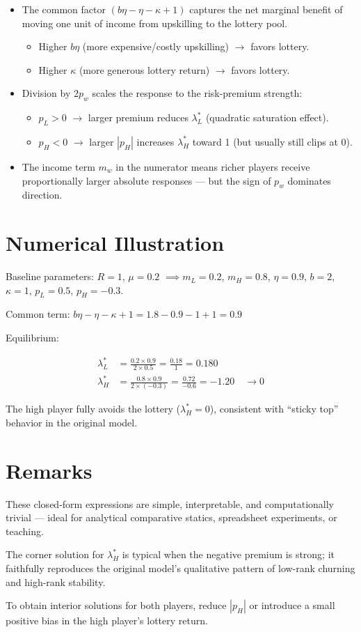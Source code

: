 \documentclass[11pt]{article}
\begin{document}
\begin{itemize}
    \item The common factor $(b \eta - \eta - \kappa + 1)$ captures the net marginal benefit of moving one unit of income from upskilling to the lottery pool.
          \begin{itemize}
              \item Higher $b \eta$ (more expensive/costly upskilling) $\to$ favors lottery.
              \item Higher $\kappa$ (more generous lottery return) $\to$ favors lottery.
          \end{itemize}
    \item Division by $2 p_w$ scales the response to the risk-premium strength:
          \begin{itemize}
              \item $p_L > 0$ $\to$ larger premium reduces $\lambda_L^*$ (quadratic saturation effect).
              \item $p_H < 0$ $\to$ larger $|p_H|$ increases $\lambda_H^*$ toward 1 (but usually still clips at 0).
          \end{itemize}
    \item The income term $m_w$ in the numerator means richer players receive proportionally larger absolute responses — but the sign of $p_w$ dominates direction.
\end{itemize}

\section{Numerical Illustration}

Baseline parameters: $R=1$, $\mu=0.2$ $\implies m_L=0.2$, $m_H=0.8$,  
$\eta=0.9$, $b=2$, $\kappa=1$, $p_L=0.5$, $p_H=-0.3$.

Common term: $b\eta - \eta - \kappa + 1 = 1.8 - 0.9 - 1 + 1 = 0.9$

Equilibrium:

\begin{align*}
\lambda_L^* &= \frac{0.2 \times 0.9}{2 \times 0.5} = \frac{0.18}{1} = 0.180 \\
\lambda_H^* &= \frac{0.8 \times 0.9}{2 \times (-0.3)} = \frac{0.72}{-0.6} = -1.20 \quad \to \boxed{0}
\end{align*}

The high player fully avoids the lottery ($\lambda_H^* = 0$), consistent with ``sticky top'' behavior in the original model.

\section{Remarks}

These closed-form expressions are simple, interpretable, and computationally trivial — ideal for analytical comparative statics, spreadsheet experiments, or teaching.  

The corner solution for $\lambda_H^*$ is typical when the negative premium is strong; it faithfully reproduces the original model's qualitative pattern of low-rank churning and high-rank stability.  

To obtain interior solutions for both players, reduce $|p_H|$ or introduce a small positive bias in the high player's lottery return.
\end{document}
